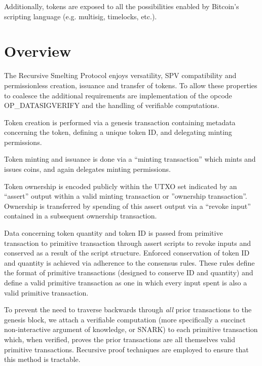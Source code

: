 \documentclass[9pt,oneside]{amsart}
\begin{document}
Additionally, tokens are exposed to all the possibilities enabled by Bitcoin's scripting language  (e.g. multisig, timelocks, etc.).

\section{Overview}
The Recursive Smelting Protocol enjoys versatility, SPV compatibility and permissionless creation, issuance and transfer of tokens. To allow these properties to coalesce the additional requirements are implementation of the opcode OP\_DATASIGVERIFY and the handling of verifiable computations.

Token creation is performed via a genesis transaction containing metadata concerning the token, defining a unique token ID, and delegating minting permissions.

Token minting and issuance is done via a ``minting transaction'' which mints and issues coins, and again delegates minting permissions.

Token ownership is encoded publicly within the UTXO set indicated by an ``assert'' output within a valid minting transaction or ''ownership transaction''. Ownership is transferred by spending of this assert output via a ``revoke input'' contained in a subsequent ownership transaction. 

Data concerning token quantity and token ID is passed from primitive transaction to primitive transaction through assert scripts to revoke inputs and conserved as a result of the script structure. Enforced conservation of token ID and quantity is achieved via adherence to the consensus rules. These rules define the format of primitive transactions (designed to conserve ID and quantity) and define a valid primitive transaction as one in which every input spent is also a valid primitive transaction.

To prevent the need to traverse backwards through \emph{all} prior transactions to the genesis block, we attach a verifiable computation (more specifically a succinct non-interactive argument of knowledge, or SNARK) to each primitive transaction which, when verified, proves the prior transactions are all themselves valid primitive transactions. Recursive proof techniques are employed to ensure that this method is tractable. 
\end{document}
